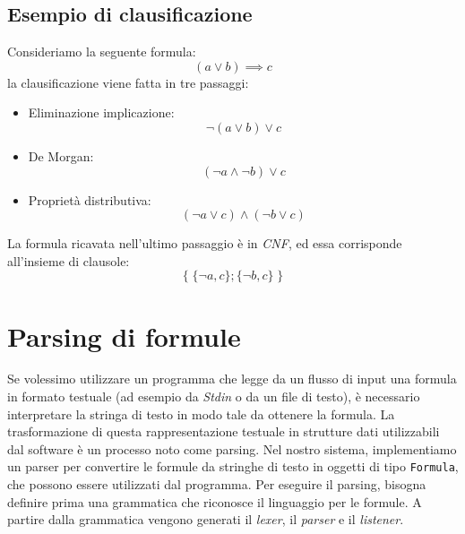 \documentclass[a4paper,12pt]{report}
\begin{document}
\subsection{Esempio di clausificazione}
Consideriamo la seguente formula:
\[ (a \lor b) \implies c \]
la clausificazione viene fatta in tre passaggi:

\begin{itemize}
    \item Eliminazione implicazione:
    \[ \lnot (a \lor b) \lor c \]
    \item De Morgan:
    \[ (\lnot a \land \lnot b) \lor c \]
    \item Proprietà distributiva:
    \[ (\lnot a \lor c) \land (\lnot b \lor c) \]
\end{itemize}

La formula ricavata nell'ultimo passaggio è in \emph{CNF}, ed essa corrisponde all'insieme di clausole:
\[ \{ \; \{\lnot a, c\}; \{\lnot b, c\} \; \} \]

\section{Parsing di formule}
\label{parsing}
Se volessimo utilizzare un programma che legge da un flusso di input una formula in formato testuale (ad esempio da \emph{Stdin} o da un file di testo), è necessario interpretare la stringa di testo in modo tale da ottenere la formula. La trasformazione di questa rappresentazione testuale in strutture dati utilizzabili dal software è un processo noto come parsing. Nel nostro sistema, implementiamo un parser per convertire le formule da stringhe di testo in oggetti di tipo \texttt{Formula}, che possono essere utilizzati dal programma. Per eseguire il parsing, bisogna definire prima una grammatica che riconosce il linguaggio per le formule. A partire dalla grammatica vengono generati il \emph{lexer}, il \emph{parser} e il \emph{listener}.
\end{document}
